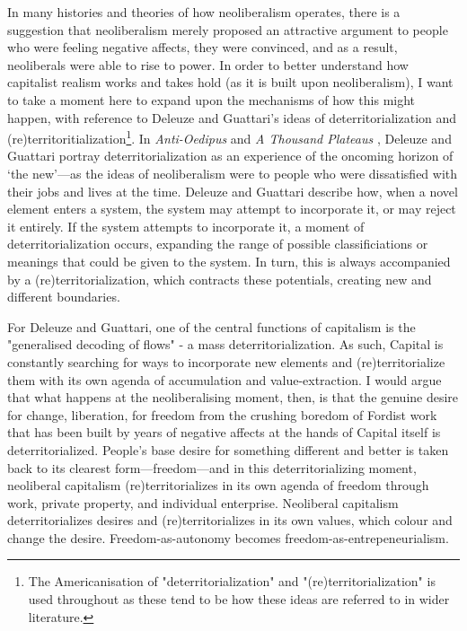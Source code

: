 In many histories and theories of how neoliberalism operates, there is a suggestion that neoliberalism merely proposed an attractive argument to people who were feeling negative affects, they were convinced, and as a result, neoliberals were able to rise to power. In order to better understand how capitalist realism works and takes hold (as it is built upon neoliberalism), I want to take a moment here to  expand upon the mechanisms of how this might happen,  with reference to Deleuze and Guattari's ideas of deterritorialization and (re)territoritialization\footnote{The Americanisation of "deterritorialization" and "(re)territorialization" is used throughout as these tend to be how these ideas are referred to in wider literature.}. In \textit{Anti-Oedipus} \citeyearpar{deleuze_anti-oedipus:_1983} and \emph{A Thousand Plateaus} \citeyearpar{deleuze_thousand_1987}, Deleuze and Guattari portray deterritorialization as an experience of the oncoming horizon of `the new'—as the ideas of neoliberalism were to people who were dissatisfied with their jobs and lives at the time. Deleuze and Guattari describe how, when a novel element enters a system, the system may attempt to incorporate it, or may reject it entirely. If the system attempts to incorporate it, a moment of deterritorialization occurs, expanding the range of possible classificiations or meanings that could be given to the system. In turn, this is always accompanied by a (re)territorialization, which contracts these potentials, creating new and different boundaries. 

For Deleuze and Guattari, one of the central functions of capitalism is the "generalised decoding of flows" \citep[p. 153]{deleuze_anti-oedipus:_1983} - a mass deterritorialization. As such, Capital is constantly searching for ways to incorporate new elements and (re)territorialize them with its own agenda of accumulation and value-extraction. I would argue that what happens at the neoliberalising moment, then, is that the genuine desire for change, liberation, for freedom from the crushing boredom of Fordist work that has been built by years of negative affects at the hands of Capital itself is deterritorialized. People's base desire for something different and better is taken back to its clearest form—freedom—and in this deterritorializing moment, neoliberal capitalism (re)territorializes in its own agenda of freedom through work, private property, and individual enterprise. Neoliberal capitalism deterritorializes desires and (re)territorializes in its own values, which colour and change the desire. Freedom-as-autonomy becomes freedom-as-entrepeneurialism.

